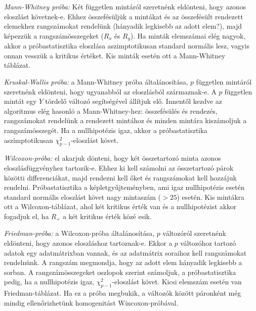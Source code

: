 \emph{Mann-Whitney próba:} Két független mintáról szeretnénk eldönteni, hogy azonos eloszlást követnek-e. Ehhez összefésüljük a mintákat és az összefésült rendezett elemekhez rangszámokat rendelünk (hányadik legkisebb az adott elem?), majd képezzük a rangszámösszegeket ($R_x$ és $R_y$). Ha minták elemszámai elég nagyok, akkor a próbastatisztika eloszlása aszimptotikusan standard normális lesz, vagyis onnan vesszük a kritikus értéket. Kis minták esetén ott a Mann-Whitney táblázat.

\emph{Kruskal-Wallis próba:} a Mann-Whitney próba általánosítása, $p$ független mintáról szeretnénk eldönteni, hogy ugyanabból az eloszlásból származnak-e. A $p$ független mintát egy $Y$ tördelő változó segítségével állítjuk elő. Innentől kezdve az algoritmus elég hasonló a Mann-Whitney-hez: összefésülés és rendezés, rangszámokat rendelünk a rendezett mintához és minden mintára kiszámoljuk a rangszámösszegét. Ha a nullhipotézis igaz, akkor a próbastatisztika aszimptotikusan $\chi^2_{p-1}$-eloszlást követ.

\emph{Wilcoxon-próba:} el akarjuk dönteni, hogy két összetartozó minta azonos eloszlásfüggvényhez tartozik-e. Ehhez ki kell számolni az összetartozó párok közötti differenciákat, majd rendezni kell őket és rangszámokat kell hozzájuk rendelni. Próbastatisztika a képletgyűjteményben, ami igaz nullhipotézis esetén standard normális eloszlást követ nagy mintaszám ($>25$) esetén. Kis mintákra ott a Wilcoxon-táblázat, ahol két kritikus érték van és a nullhipotézist akkor fogadjuk el, ha $R_+$ a két kritikus érték közé esik.

\emph{Friedman-próba:} a Wilcoxon-próba általánosítása, $p$ változóról szeretnénk eldönteni, hogy azonos eloszláshoz tartoznak-e. Ekkor a $p$ változóhoz tartozó adatok egy adatmátrixban vannak, és az adatmátrix soraihoz kell rangszámokat rendelnünk. A rangszám megmondja, hogy az adott elem hányadik legkisebb a sorban. A rangszámösszegeket oszlopok szerint számoljuk, a próbastatisztika pedig, ha a nullhipotézis igaz, $\chi^2_{p-1}$-eloszlást követ. Kicsi elemszám esetén van Friedman-táblázat. Ha ez a próba megbukik, a változók között páronként még mindig ellenőrizhetünk homogenitást Wincoxon-próbával.




